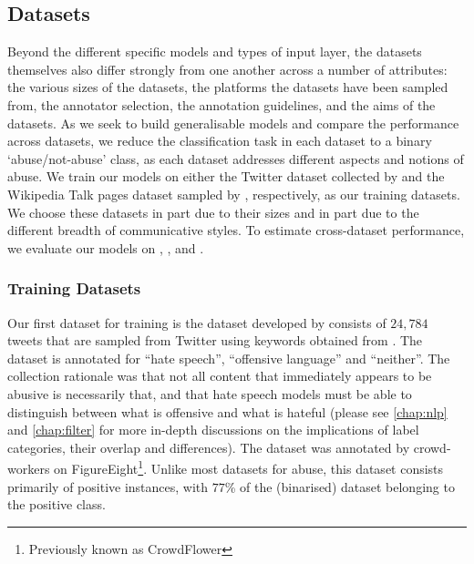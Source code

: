 \subsection{Datasets}
Beyond the different specific models and types of input layer, the datasets themselves also differ strongly from one another across a number of attributes: the various sizes of the datasets, the platforms the datasets have been sampled from, the annotator selection, the annotation guidelines, and the aims of the datasets. As we seek to build generalisable models and compare the performance across datasets, we reduce the classification task in each dataset to a binary `abuse/not-abuse' class, as each dataset addresses different aspects and notions of abuse.
We train our models on either the Twitter dataset collected by \citet{Davidson:2017} and the Wikipedia Talk pages dataset sampled by \citet{Wulczyn:2016}, respectively, as our training datasets. We choose these datasets in part due to their sizes and in part due to the different breadth of communicative styles. To estimate cross-dataset performance, we evaluate our models on \citet{Waseem-Hovy:2016}, \citet{Waseem:2016}, and \citet{Garcia:2019}.


\subsubsection{Training Datasets}
Our first dataset for training is the dataset developed by \citet{Davidson:2017} consists of $24,784$ tweets that are sampled from Twitter using keywords obtained from \citet{Hatebase}. The dataset is annotated for ``hate speech'', ``offensive language'' and ``neither''. The collection rationale was that not all content that immediately appears to be abusive is necessarily that, and that hate speech models must be able to distinguish between what is offensive and what is hateful \cite{Davidson:2017} (please see \autoref{chap:nlp} and \autoref{chap:filter} for more in-depth discussions on the implications of label categories, their overlap and differences). The dataset was annotated by crowd-workers on FigureEight\footnote{Previously known as CrowdFlower}. Unlike most datasets for abuse, this dataset consists primarily of positive instances, with $77$\% of the (binarised) dataset belonging to the positive class.

